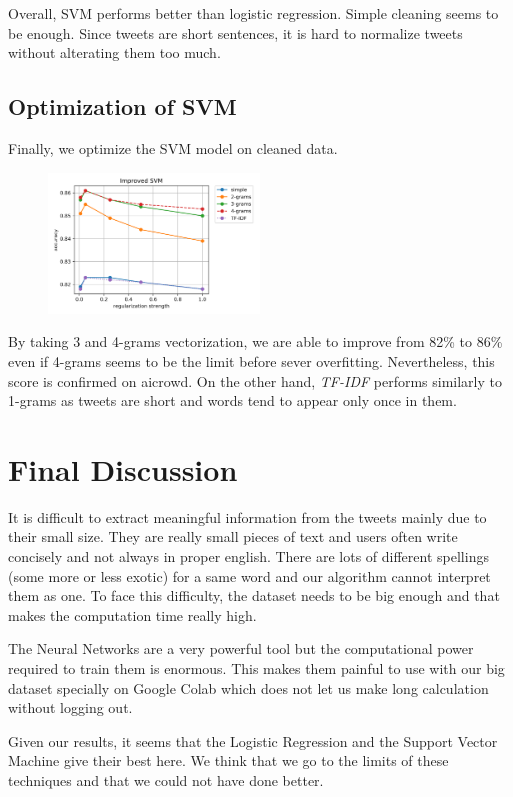 \documentclass[11pt, a4paper, twocolumn]{article}
\begin{document}
Overall, SVM performs better than logistic regression. Simple cleaning seems to be enough. Since tweets are short sentences, it is hard to normalize tweets without alterating them too much.

\subsection{Optimization of SVM}
Finally, we optimize the SVM model on cleaned data.

\begin{figure}[h]
	\includegraphics[width=0.5\textwidth]{../plots/improved_svm.png}
\end{figure}

By taking 3 and 4-grams vectorization, we are able to improve from 82\% to 86\% even if 4-grams seems to be the limit before sever overfitting. Nevertheless, this score is confirmed on aicrowd. On the other hand, \textit{TF-IDF} performs similarly to 1-grams as tweets are short and words tend to appear only once in them.

\section{Final Discussion}
It is difficult to extract meaningful information 
from the tweets mainly due to their small size. They are really small pieces of text and users often write concisely and not always in proper english. There are lots of different spellings (some more or less exotic) for a same word 
and our algorithm cannot interpret them as one.
To face this difficulty, the dataset needs to be big enough and that makes the computation 
time really high.

The Neural Networks are a very powerful tool but the computational power required to train them 
is enormous. This makes them painful to use with our big dataset specially on Google Colab which does not let us make long calculation without logging out. 

Given our results, it seems that the Logistic Regression and the Support Vector Machine give their best here. We think that we go to the limits of these 
techniques and that we could not have done better. 
\end{document}
